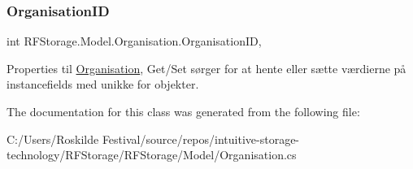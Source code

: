 \subsubsection{\texorpdfstring{OrganisationID}{OrganisationID}}
{\footnotesize\ttfamily int R\+F\+Storage.\+Model.\+Organisation.\+Organisation\+ID\hspace{0.3cm}{\ttfamily [get]}, {\ttfamily [set]}}



Properties til \mbox{\hyperlink{class_r_f_storage_1_1_model_1_1_organisation}{Organisation}}, Get/\+Set sørger for at hente eller sætte værdierne på instancefields med unikke for objekter. 



The documentation for this class was generated from the following file\+:\begin{DoxyCompactItemize}
\item 
C\+:/\+Users/\+Roskilde Festival/source/repos/intuitive-\/storage-\/technology/\+R\+F\+Storage/\+R\+F\+Storage/\+Model/Organisation.\+cs\end{DoxyCompactItemize}
